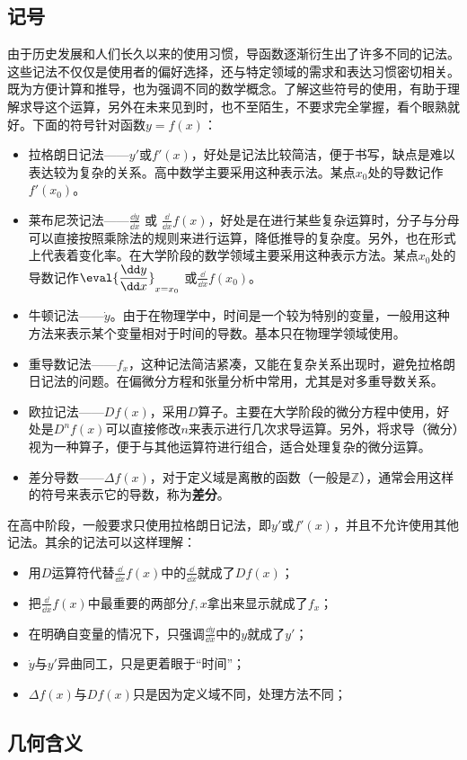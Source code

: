\subsection{记号}
由于历史发展和人们长久以来的使用习惯，导函数逐渐衍生出了许多不同的记法。这些记法不仅仅是使用者的偏好选择，还与特定领域的需求和表达习惯密切相关。既为方便计算和推导，也为强调不同的数学概念。了解这些符号的使用，有助于理解求导这个运算，另外在未来见到时，也不至陌生，不要求完全掌握，看个眼熟就好。下面的符号针对函数$y=f(x)$：
\begin{itemize}
\item 拉格朗日记法——$y'$或$f'(x)$，好处是记法比较简洁，便于书写，缺点是难以表达较为复杂的关系。高中数学主要采用这种表示法。某点$x_0$处的导数记作$f'(x_0)$。
\item 莱布尼茨记法——$\displaystyle\frac{\dd y}{\dd x}$  或  $\displaystyle\frac{\dd}{\dd x}f(x)$，好处是在进行某些复杂运算时，分子与分母可以直接按照乘除法的规则来进行运算，降低推导的复杂度。另外，也在形式上代表着变化率。在大学阶段的数学领域主要采用这种表示方法。某点$x_0$处的导数记作$\displaystyle\eval{\dfrac{\dd y}{\dd x}}_{x=x_0}$ 或$\displaystyle\frac{\dd}{\dd x}f(x_0)$。
\item 牛顿记法——$\dot{y}$。由于在物理学中，时间是一个较为特别的变量，一般用这种方法来表示某个变量相对于时间的导数。基本只在物理学领域使用。
\item 重导数记法——$f_x$，这种记法简洁紧凑，又能在复杂关系出现时，避免拉格朗日记法的问题。在偏微分方程和张量分析中常用，尤其是对多重导数关系。
\item 欧拉记法——$Df(x)$，采用$D$算子。主要在大学阶段的微分方程中使用，好处是$D^n f(x)$可以直接修改$n$来表示进行几次求导运算。另外，将求导（微分）视为一种算子，便于与其他运算符进行组合，适合处理复杂的微分运算。
\item 差分导数——$\Delta f(x)$，对于定义域是离散的函数（一般是$\mathbb{Z}$），通常会用这样的符号来表示它的导数，称为\textbf{差分}。
\end{itemize}

在高中阶段，一般要求只使用拉格朗日记法，即$y'$或$f'(x)$，并且不允许使用其他记法。其余的记法可以这样理解：
\begin{itemize}
\item 用$D$运算符代替$\displaystyle\frac{\dd}{\dd x}f(x)$中的$\displaystyle\frac{\dd}{\dd x}$就成了$Df(x)$；
\item 把$\displaystyle\frac{\dd}{\dd x}f(x)$中最重要的两部分$f,x$拿出来显示就成了$f_x$；
\item 在明确自变量的情况下，只强调$\displaystyle\frac{\dd y}{\dd x}$中的$y$就成了$y'$；
\item $\dot{y}$与$y'$异曲同工，只是更着眼于“时间”；
\item $\Delta f(x)$与$Df(x)$只是因为定义域不同，处理方法不同；
\end{itemize}

\subsection{几何含义}

